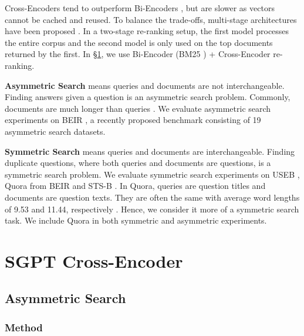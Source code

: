 \documentclass{article}
\begin{document}
Cross-Encoders tend to outperform Bi-Encoders \cite{thakur2020augmented}, but are slower as vectors cannot be cached and reused. To balance the trade-offs, multi-stage architectures have been proposed \cite{nogueira2019multi, qu2020rocketqa, khattab2020colbert}. In a two-stage re-ranking setup, the first model processes the entire corpus and the second model is only used on the top  documents returned by the first. In \S\ref{sec:ce}, we use Bi-Encoder (BM25 \cite{robertson2009probabilistic}) + Cross-Encoder re-ranking.

\textbf{Asymmetric Search} means queries and documents are not interchangeable. Finding answers given a question is an asymmetric search problem. Commonly, documents are much longer than queries \cite{thakur2021beir}. We evaluate asymmetric search experiments on BEIR \cite{thakur2021beir}, a recently proposed benchmark consisting of 19 asymmetric search datasets.

\textbf{Symmetric Search} means queries and documents are interchangeable. Finding duplicate questions, where both queries and documents are questions, is a symmetric search problem. We evaluate symmetric search experiments on USEB \cite{wang2021tsdae}, Quora from BEIR \cite{thakur2021beir} and STS-B \cite{cer2017semeval}. In Quora, queries are question titles and documents are question texts. They are often the same with average word lengths of 9.53 and 11.44, respectively \cite{thakur2021beir}. Hence, we consider it more of a symmetric search task. We include Quora in both symmetric and asymmetric experiments.

\section{SGPT Cross-Encoder}\label{sec:ce}


\subsection{Asymmetric Search}\label{sec:ceasym}


\subsubsection{Method}\label{sec:ceasymmeth}
\end{document}
